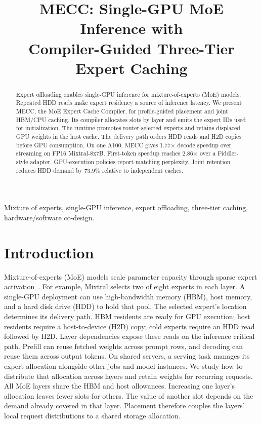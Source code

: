 \documentclass[conference,9pt,letterpaper]{IEEEtran}
\title{MECC: Single-GPU MoE Inference with\protect\\Compiler-Guided Three-Tier Expert Caching}
\author{}
\begin{document}
\maketitle\flushbottom
\begin{abstract}
Expert offloading enables single-GPU inference for mixture-of-experts (MoE) models. Repeated HDD reads make expert residency a source of inference latency. We present MECC, the MoE Expert Cache Compiler, for profile-guided placement and joint HBM/CPU caching. Its compiler allocates slots by layer and emits the expert IDs used for initialization. The runtime promotes router-selected experts and retains displaced GPU weights in the host cache. The delivery path orders HDD reads and H2D copies before GPU consumption. On one A100, MECC gives 1.77$\times$ decode speedup over streaming on FP16 Mixtral-8x7B. First-token speedup reaches 2.86$\times$ over a Fiddler-style adapter. GPU-execution policies report matching perplexity. Joint retention reduces HDD demand by 73.9\% relative to independent caches.
\end{abstract}

\begin{IEEEkeywords}
Mixture of experts, single-GPU inference, expert offloading, three-tier caching, hardware/software co-design.
\end{IEEEkeywords}

\section{Introduction}
Mixture-of-experts (MoE) models scale parameter capacity through sparse expert activation~\cite{shazeer,switch,mixtral,deepseekmoe}. For example, Mixtral selects two of eight experts in each layer. A single-GPU deployment can use high-bandwidth memory (HBM), host memory, and a hard disk drive (HDD) to hold that pool. The selected expert's location determines its delivery path. HBM residents are ready for GPU execution; host residents require a host-to-device (H2D) copy; cold experts require an HDD read followed by H2D. Layer dependencies expose these reads on the inference critical path. Prefill can reuse fetched weights across prompt rows, and decoding can reuse them across output tokens. On shared servers, a serving task manages its expert allocation alongside other jobs and model instances. We study how to distribute that allocation across layers and retain weights for recurring requests. All MoE layers share the HBM and host allowances. Increasing one layer's allocation leaves fewer slots for others. The value of another slot depends on the demand already covered in that layer. Placement therefore couples the layers' local request distributions to a shared storage allocation.
\end{document}
